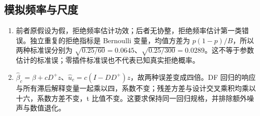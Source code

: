 \subsection*{模拟频率与尺度}
\begin{enumerate}[leftmargin=*]
\item 前者原假设为假，拒绝频率估计功效；后者无协整，拒绝频率估计第一类错误。独立重复的拒绝指标是 Bernoulli 变量，均值方差为 $p(1-p)/B$，所以两种标准误分别为 $\sqrt{0.25/60}=0.0645$、$\sqrt{0.25/300}=0.0289$。这不等于参数估计的标准误；零插件标准误也不代表已知真实拒绝概率。
\item $\hat\beta_c=\beta+cD^+z$、$\hat u_c=c(I-DD^+)z$，故两种误差变成四倍。DF 回归的响应与所有滞后解释变量一起乘以四，系数不变；残差方差与设计交叉乘积均乘以十六，系数方差不变，t 比值不变。这要求保持同一回归规格，并排除额外噪声与数值退化。
\end{enumerate}
